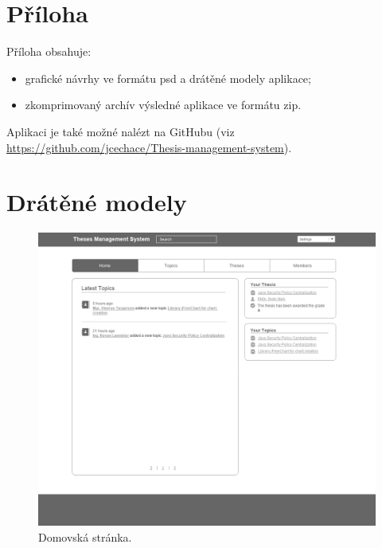 \chapter{Příloha}

Příloha obsahuje:

\begin{itemize}
    \item grafické návrhy ve formátu psd a drátěné modely aplikace;
    \item zkomprimovaný archív výsledné aplikace ve formátu zip.
\end{itemize}

Aplikaci je také možné nalézt na GitHubu (viz \url{https://github.com/jcechace/Thesis-management-system}).

\chapter{Drátěné modely}

\begin{figure}[htbp]
    \centering
    \includegraphics[width=\textwidth]{images/w2.png}
    \caption{Domovská stránka.}
    \label{img:layout1}
\end{figure}

